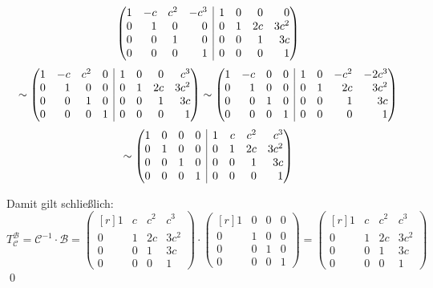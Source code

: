 \documentclass[answers]{exam}
\makeatletter
\newenvironment{sysmatrix}[1]
  {\left(\begin{array}{@{}#1@{}}}
  {\end{array}\right)}
\newcommand{\vektor}[1]{\begin{pmatrix*}[r] #1 \end{pmatrix*}}
\newcommand{\B}{\mathcal{B}}
\makeatother
\begin{document}
\begin{questions}
\begin{solution}
$$\begin{sysmatrix}{rrrr|rrrr}
                1 & -c & c^2 & -c^3 & 1 & 0 & 0 & 0 \\
                0 & 1 & 0 & 0 & 0 & 1 & 2c & 3c^2  \\
                0 & 0 & 1 & 0 & 0 & 0 & 1 & 3c  \\
                0 & 0 & 0 & 1 & 0 & 0 & 0 & 1
            \end{sysmatrix}
        $$
        $$
            \sim
            \begin{sysmatrix}{rrrr|rrrr}
                1 & -c & c^2 & 0 & 1 & 0 & 0 & c^3 \\
                0 & 1 & 0 & 0 & 0 & 1 & 2c & 3c^2  \\
                0 & 0 & 1 & 0 & 0 & 0 & 1 & 3c  \\
                0 & 0 & 0 & 1 & 0 & 0 & 0 & 1
            \end{sysmatrix}
            \sim
            \begin{sysmatrix}{rrrr|rrrr}
                1 & -c & 0 & 0 & 1 & 0 & -c^2 & -2c^3 \\
                0 & 1 & 0 & 0 & 0 & 1 & 2c & 3c^2  \\
                0 & 0 & 1 & 0 & 0 & 0 & 1 & 3c  \\
                0 & 0 & 0 & 1 & 0 & 0 & 0 & 1
            \end{sysmatrix}
        $$
        $$
            \sim
            \begin{sysmatrix}{rrrr|rrrr}
                1 & 0 & 0 & 0 & 1 & c & c^2 & c^3 \\
                0 & 1 & 0 & 0 & 0 & 1 & 2c & 3c^2  \\
                0 & 0 & 1 & 0 & 0 & 0 & 1 & 3c  \\
                0 & 0 & 0 & 1 & 0 & 0 & 0 & 1
            \end{sysmatrix}
        $$

        Damit gilt schließlich:
        $$
            T^\B_\mathcal{C} = \mathcal{C}^{-1} \cdot \B = \vektor{1 & c & c^2 & c^3 \\ 0 & 1 & 2c & 3c^2 \\ 0 & 0 & 1 & 3c \\ 0 & 0 & 0 & 1} \cdot \vektor{1 & 0 & 0 & 0 \\ 0 & 1 & 0 & 0 \\ 0 & 0 & 1 & 0 \\ 0 & 0 & 0 & 1} = \vektor{1 & c & c^2 & c^3 \\ 0 & 1 & 2c & 3c^2 \\ 0 & 0 & 1 & 3c \\ 0 & 0 & 0 & 1}
        $$\qed
    \end{solution}


\end{questions}
\end{document}

